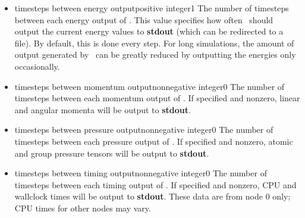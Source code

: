 \begin{itemize}
%
%
%

\item
{}
{timesteps between energy output}{positive integer}{1}
{
The number of timesteps between each energy output of \NAMD.  
This value
specifies how often \NAMD\ should output the current energy 
values to {\bf stdout} (which can be redirected to a file).  
By default, this is done every step.  
For long simulations, 
the amount of output generated by \NAMD\ can be greatly reduced 
by outputting the energies only occasionally.  
}

\item
{}
{timesteps between momentum output}{nonnegative integer}{0}
{
The number of timesteps between each momentum output of \NAMD.
If specified and nonzero, linear and angular momenta will be
output to {\bf stdout}.
}

\item
{}
{timesteps between pressure output}{nonnegative integer}{0}
{
The number of timesteps between each pressure output of \NAMD.
If specified and nonzero, atomic and group pressure tensors
will be output to {\bf stdout}.
}

\item
{}
{timesteps between timing output}{nonnegative integer}{0}
{
The number of timesteps between each timing output of \NAMD.
If specified and nonzero, CPU and wallclock times will be
output to {\bf stdout}.
These data are from node 0 only; CPU times for other nodes
may vary.
}

\end{itemize}


